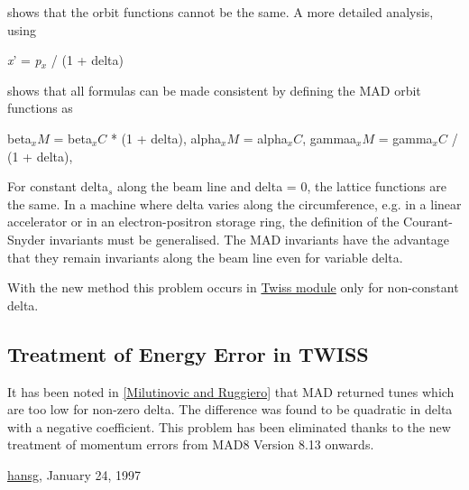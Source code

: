  shows that the orbit functions cannot be the same. A more detailed analysis, using 

\textit{x}' = \textit{p$_x$} / (1 + delta) 

 shows that all formulas can be made consistent by defining the MAD orbit functions as 

 beta$_\textit{x}M$ = beta$_\textit{x}C$ * (1 + delta), alpha$_\textit{x}M$ = alpha$_\textit{x}C$, gammaa$_\textit{x}M$ = gamma$_\textit{x}C$ / (1 + delta), 

 For constant delta$_\textit{s}$ along the beam line and delta = 0, the lattice functions are the same. In a machine where delta varies along the circumference, e.g. in a linear accelerator or in an electron-positron storage ring, the definition of the Courant-Snyder invariants must be generalised. The MAD invariants have the advantage that they remain invariants along the beam line even for variable delta. 

 With the new method this problem occurs in  \href{../twiss/twiss.html}{Twiss module} only for non-constant delta.  

\subsection{Treatment of Energy Error in TWISS} It has been noted in \href{bibliography.html#ruggiero}{[Milutinovic and Ruggiero]} that MAD returned tunes which are too low for non-zero delta. The difference was found to be quadratic in delta with a negative coefficient. This problem has been eliminated thanks to the new treatment  of momentum errors from MAD8 Version 8.13 onwards.  

\href{http://www.cern.ch/Hans.Grote/hansg_sign.html}{hansg}, January 24, 1997 

